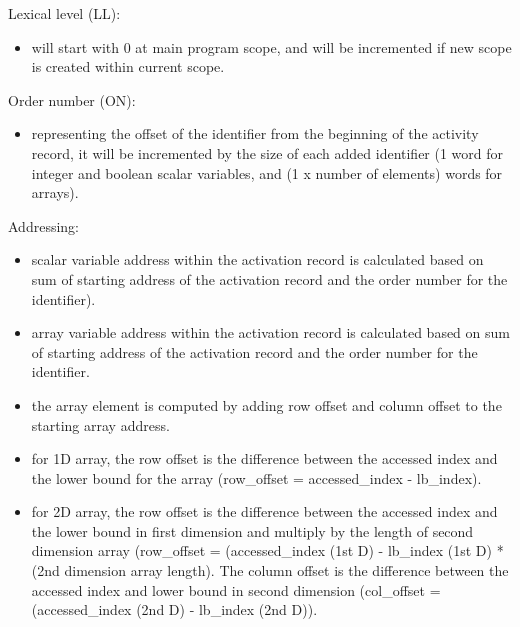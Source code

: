 \documentclass[11pt]{article}
\begin{document}
Lexical level (LL):
\begin{itemize}
\item will start with 0 at main program scope, and will be 
    incremented if new scope is created within current scope.
\end{itemize}
Order number (ON):
\begin{itemize}
\item representing the offset of the identifier from the beginning of the
    activity record, it will be incremented by the size of each added 
    identifier (1 word for integer and boolean scalar variables, and (1 x
    number of elements) words for arrays).
\end{itemize}
Addressing:
\begin{itemize}
    \item scalar variable address within the activation record is 
    calculated based on sum of starting address of the 
    activation record and the order number for the identifier).
    
    \item array variable address within the activation record is
    calculated based on sum of starting address of the
    activation record and the order number for the identifier.
    
    \item the array element is computed by adding row offset and 
    column offset to the starting array address.
    
    \item for 1D array, the row offset is the difference between the
    accessed index and the lower bound for the array (row\_offset =
    accessed\_index - lb\_index).
    
    \item for 2D array, the row offset is the difference between the
    accessed index and the lower bound in first dimension and multiply
    by the length of second dimension array (row\_offset = 
    (accessed\_index (1st D) - lb\_index (1st D) * (2nd dimension array
    length). The column offset is the difference between the accessed
    index and lower bound in second dimension (col\_offset =
    (accessed\_index (2nd D) - lb\_index (2nd D)). 
\end{itemize}
\end{document}
